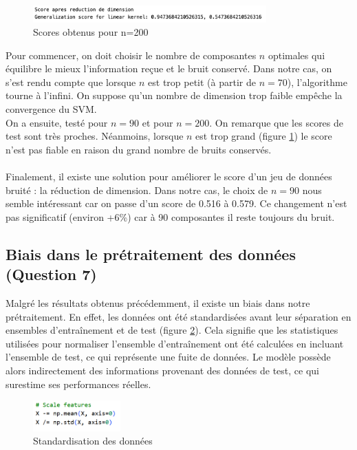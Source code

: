 \documentclass[a4paper,12pt]{article}
\begin{document}
\begin{figure}[H]
    \centering
    \includegraphics[width=0.8\textwidth]{Images/n=200.png}
    \caption{Scores obtenus pour n=200}\label{fig : dim2}
\end{figure}

Pour commencer, on doit choisir le nombre de composantes $n$ optimales qui équilibre le mieux l'information reçue et le bruit conservé.
Dans notre cas, on s'est rendu compte que lorsque $n$ est trop petit (à partir de $n = 70$), l'algorithme tourne à l'infini. On suppose qu'un  nombre de dimension trop faible empêche la convergence du SVM.\\
On a ensuite, testé pour $n = 90$ et pour $n = 200$. On remarque que les scores de test sont très proches. Néanmoins, lorsque $n$ est trop grand (figure \ref{fig : dim2}) le score n'est pas fiable en raison du grand nombre de bruits conservés.\\
\\
Finalement, il existe une solution pour améliorer le score d'un jeu de données bruité : la réduction de dimension. Dans notre cas, le choix de $n = 90$ nous semble intéressant car on passe d'un score de 0.516 à 0.579.
Ce changement n'est pas significatif (environ +6\%) car à 90 composantes il reste toujours du bruit.

\subsection{Biais dans le prétraitement des données (Question 7)}

Malgré les résultats obtenus précédemment, il existe un biais dans notre prétraitement. 
En effet, les données ont été standardisées avant leur séparation en ensembles d'entraînement et de test (figure \ref{fig : q7}).
Cela signifie que les statistiques utilisées pour normaliser l'ensemble d'entraînement ont été calculées en incluant l'ensemble de test, ce qui représente une fuite de données. 
Le modèle possède alors indirectement des informations provenant des données de test, ce qui surestime ses performances réelles.


\begin{figure}[H]    
    \centering    
    \includegraphics[width=0.3\textwidth]{Images/q7.png}
    \caption{Standardisation des données}\label{fig : q7}
\end{figure}
\end{document}
